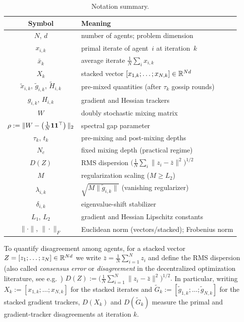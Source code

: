\documentclass[review,onefignum,onetabnum]{siamart171218}
\begin{document}
	\begin{table}[htbp]
		\centering
		\caption{Notation summary.}
		\label{tab:notation}
		\setlength{\tabcolsep}{4pt}
		\small
		\begin{tabular}{cl}
			\toprule
			Symbol & Meaning \\
			\midrule
			$N$, $d$ & number of agents; problem dimension \\
			$x_{i,k}$ & primal iterate of agent~$i$ at iteration~$k$ \\
			$\bar x_k$ & average iterate $\frac1N\sum_i x_{i,k}$ \\
			$X_k$ & stacked vector $[x_{1,k};\dots;x_{N,k}]\in\mathbb{R}^{Nd}$ \\
			$\tilde x_{i,k}$, $\tilde g_{i,k}$, $\tilde H_{i,k}$ & pre-mixed quantities (after $\tau_k$ gossip rounds) \\
			$g_{i,k}$, $H_{i,k}$ & gradient and Hessian trackers \\
			$W$ & doubly stochastic mixing matrix \\
			$\rho:=\|W-\left(\frac{1}{N}\mathbf{1}\mathbf{1}^\top\right)\|_2$ & spectral gap parameter \\
			$\tau_k$, $t_k$ & pre-mixing and post-mixing depths \\
			$N_c$ & fixed mixing depth (practical regime) \\
			$D(Z)$ & RMS dispersion $\bigl(\frac1N\sum_i\|z_i-\bar z\|^2\bigr)^{1/2}$ \\
			$M$ & regularization scaling ($M\ge L_2$) \\
			$\lambda_{i,k}$ & $\sqrt{M\|\tilde g_{i,k}\|}$ (vanishing regularizer) \\
			$\delta_{i,k}$ & eigenvalue-shift stabilizer \\
			$L_1$, $L_2$ & gradient and Hessian Lipschitz constants \\
			$\|\cdot\|$, $\|\cdot\|_F$ & Euclidean norm (vectors/stacked); Frobenius norm \\
			\bottomrule
		\end{tabular}
	\end{table}
	
	To quantify disagreement among agents, for a stacked vector $Z=[z_1;\dots;z_N]\in\mathbb{R}^{Nd}$
	we write $\bar z=\frac1N\sum_{i=1}^N z_i$ and define the RMS dispersion
	(also called \emph{consensus error} or \emph{disagreement} in the
	decentralized optimization literature, see e.g.\
	\citet{nedic2009subgradient,nedic2017diging})
	\(
	  D(Z):=\bigl(\tfrac1N\sum_{i=1}^N\|z_i-\bar z\|^2\bigr)^{1/2}.
	\)
	In particular, writing $X_k:=[x_{1,k};\dots;x_{N,k}]$ for the stacked iterates and
	$\tilde G_k:=[\tilde g_{1,k};\dots;\tilde g_{N,k}]$ for the stacked gradient trackers,
	$D(X_k)$ and $D(\tilde G_k)$ measure the primal and gradient-tracker disagreements at iteration $k$.
\end{document}
